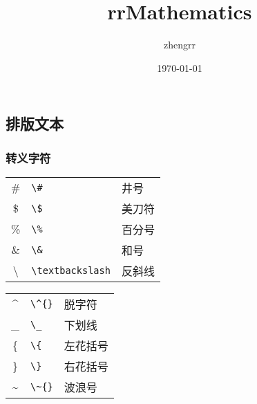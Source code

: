 \documentclass{ctexbook}
\begin{document}

\title{rrMathematics}
\author{zhengrr}
\date{\today}
\maketitle

\tableofcontents

\chapter{\LaTeXe}

\section{排版文本}

\subsection{转义字符}

\begin{table}[h!]
	\centering
	\begin{minipage}[t]{0.46\textwidth}
		\centering
		\begin{tabular}{c p{7em} p{5em}}
			\hline
			\#             & \verb|\#|             & 井号 \\
			\$             & \verb|\$|             & 美刀符 \\
			\%             & \verb|\%|             & 百分号 \\
			\&             & \verb|\&|             & 和号 \\
			\textbackslash & \verb|\textbackslash| & 反斜线 \\
			\hline
		\end{tabular}
	\end{minipage}
	\qquad
	\begin{minipage}[t]{0.46\textwidth}
		\centering
		\begin{tabular}{c p{7em} p{5em}}
			\hline
			\^{}           & \verb|\^{}|           & 脱字符 \\
			\_             & \verb|\_|             & 下划线 \\
			\{             & \verb|\{|             & 左花括号 \\
			\}             & \verb|\}|             & 右花括号 \\
			\~{}           & \verb|\~{}|           & 波浪号 \\
			\hline
		\end{tabular}
	\end{minipage}
\end{table}
\end{document}
